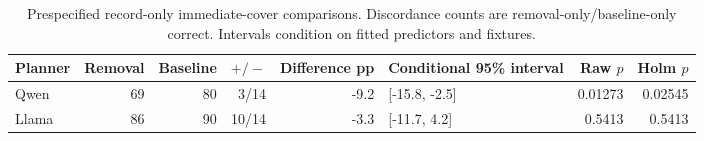 \begin{table}[t]\centering\small
\caption{Prespecified record-only immediate-cover comparisons. Discordance counts are removal-only/baseline-only correct. Intervals condition on fitted predictors and fixtures.}\label{tab:no-call-tests}
\begin{tabularx}{\textwidth}{@{}lrrrrYrr@{}}\toprule Planner & Removal & Baseline & $+/-$ & Difference pp & Conditional 95\% interval & Raw $p$ & Holm $p$ \\\midrule
Qwen & 69 & 80 & 3/14 & -9.2 & [-15.8, -2.5] & 0.01273 & 0.02545 \\
Llama & 86 & 90 & 10/14 & -3.3 & [-11.7, 4.2] & 0.5413 & 0.5413 \\
\bottomrule\end{tabularx}\end{table}
